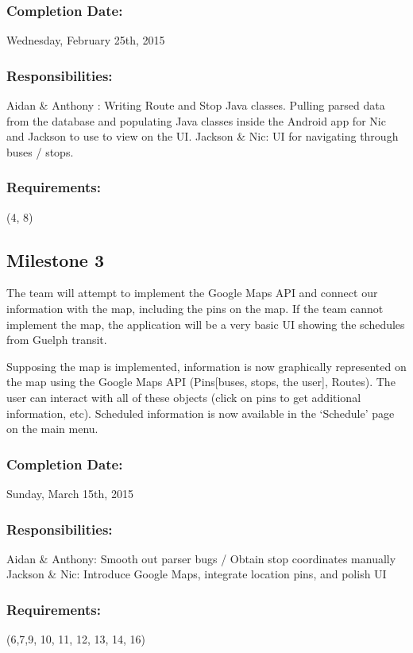 \documentclass[a4paper,12pt]{article}
\begin{document}
\subsubsection{Completion Date:} Wednesday, February 25th, 2015
\subsubsection{Responsibilities:}
Aidan \& Anthony : Writing Route and Stop Java classes. Pulling parsed data from the database and populating Java classes inside the Android app for Nic and Jackson to use to view on the UI.
Jackson \& Nic: UI for navigating through buses / stops.
\subsubsection{Requirements:} (4, 8)

\subsection{Milestone 3}
The team will attempt to implement the Google Maps API and connect our information with the map, including the pins on the map. If the team cannot implement the map, the application will be a very basic UI showing the schedules from Guelph transit.

Supposing the map is implemented, information is now graphically represented on the map using the Google Maps API (Pins[buses, stops, the user], Routes). The user can interact with all of these objects (click on pins to get additional information, etc). Scheduled information is now available in the ‘Schedule’ page on the main menu. 
\subsubsection{Completion Date:} Sunday, March 15th, 2015
\subsubsection{Responsibilities:}
Aidan \& Anthony: Smooth out parser bugs / Obtain stop coordinates manually
Jackson \& Nic: Introduce Google Maps, integrate location pins, and polish UI
\subsubsection{Requirements:} (6,7,9, 10, 11, 12, 13, 14, 16)
\end{document}
